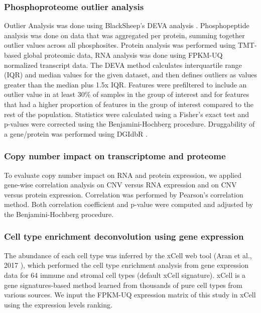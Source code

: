 \subsubsection{Phosphoproteome outlier analysis}
Outlier Analysis was done using BlackSheep’s DEVA analysis \cite{blumenbergl_fenyod:BlackSheepBioconductor2019}. Phosphopeptide analysis was done on data that was aggregated per protein, summing together outlier values across all phosphosites. Protein analysis was performed using TMT-based global proteomic data, RNA analysis was done using FPKM-UQ normalized transcript data. The DEVA method calculates interquartile range (IQR) and median values for the given dataset, and then defines outliers as values greater than the median plus 1.5x IQR. Features were prefiltered to include an outlier value in at least 30\% of samples in the group of interest and for features that had a higher proportion of features in the group of interest compared to the rest of the population. Statistics were calculated using a Fisher's exact test and p-values were corrected using the Benjamini-Hochberg procedure. Druggability of a gene/protein was performed using DGIdbR \cite{cottokc_griffithm:DGIdbRedesign2018}.

\subsubsection{Copy number impact on transcriptome and proteome}
To evaluate copy number impact on RNA and protein expression, we applied gene-wise correlation analysis on CNV versus RNA expression and on CNV versus protein expression. Correlation was performed by Pearson’s correlation method. Both correlation coefficient and p-value were computed and adjusted by the Benjamini-Hochberg procedure.

\subsubsection{Cell type enrichment deconvolution using gene expression}
The abundance of each cell type was inferred by the xCell web tool (Aran et al., 2017
), which performed the cell type enrichment analysis from gene expression data for 64 immune and stromal cell types (default xCell signature). xCell is a gene signatures-based method learned from thousands of pure cell types from various sources. We input the FPKM-UQ expression matrix of this study in xCell using the expression levels ranking.

